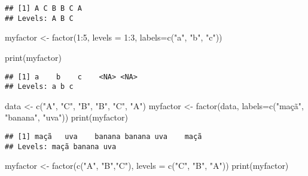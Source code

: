 \documentclass[
]{article}
\newenvironment{Shaded}{\begin{snugshade}}{\end{snugshade}}
\newcommand{\AttributeTok}[1]{\textcolor[rgb]{0.77,0.63,0.00}{#1}}
\newcommand{\DecValTok}[1]{\textcolor[rgb]{0.00,0.00,0.81}{#1}}
\newcommand{\FunctionTok}[1]{\textcolor[rgb]{0.00,0.00,0.00}{#1}}
\newcommand{\NormalTok}[1]{#1}
\newcommand{\OtherTok}[1]{\textcolor[rgb]{0.56,0.35,0.01}{#1}}
\newcommand{\SpecialCharTok}[1]{\textcolor[rgb]{0.00,0.00,0.00}{#1}}
\newcommand{\StringTok}[1]{\textcolor[rgb]{0.31,0.60,0.02}{#1}}
\begin{document}
\begin{verbatim}
## [1] A C B B C A
## Levels: A B C
\end{verbatim}

\begin{Shaded}
\begin{Highlighting}[]
\NormalTok{myfactor }\OtherTok{\textless{}{-}} \FunctionTok{factor}\NormalTok{(}\DecValTok{1}\SpecialCharTok{:}\DecValTok{5}\NormalTok{, }\AttributeTok{levels =} \DecValTok{1}\SpecialCharTok{:}\DecValTok{3}\NormalTok{,}
                   \AttributeTok{labels=}\FunctionTok{c}\NormalTok{(}\StringTok{"a"}\NormalTok{, }\StringTok{"b"}\NormalTok{, }\StringTok{"c"}\NormalTok{))}

\FunctionTok{print}\NormalTok{(myfactor)}
\end{Highlighting}
\end{Shaded}

\begin{verbatim}
## [1] a    b    c    <NA> <NA>
## Levels: a b c
\end{verbatim}

\begin{Shaded}
\begin{Highlighting}[]
\NormalTok{data }\OtherTok{\textless{}{-}} \FunctionTok{c}\NormalTok{(}\StringTok{"A"}\NormalTok{, }\StringTok{"C"}\NormalTok{, }\StringTok{"B"}\NormalTok{, }\StringTok{"B"}\NormalTok{, }\StringTok{"C"}\NormalTok{, }\StringTok{"A"}\NormalTok{)}
\NormalTok{myfactor }\OtherTok{\textless{}{-}} \FunctionTok{factor}\NormalTok{(data, }\AttributeTok{labels=}\FunctionTok{c}\NormalTok{(}\StringTok{"maçã"}\NormalTok{, }\StringTok{"banana"}\NormalTok{, }\StringTok{"uva"}\NormalTok{))}
\FunctionTok{print}\NormalTok{(myfactor)}
\end{Highlighting}
\end{Shaded}

\begin{verbatim}
## [1] maçã   uva    banana banana uva    maçã  
## Levels: maçã banana uva
\end{verbatim}

\begin{Shaded}
\begin{Highlighting}[]
\NormalTok{myfactor }\OtherTok{\textless{}{-}} \FunctionTok{factor}\NormalTok{(}\FunctionTok{c}\NormalTok{(}\StringTok{"A"}\NormalTok{, }\StringTok{"B"}\NormalTok{,}\StringTok{"C"}\NormalTok{),}
                   \AttributeTok{levels =} \FunctionTok{c}\NormalTok{(}\StringTok{"C"}\NormalTok{, }\StringTok{"B"}\NormalTok{, }\StringTok{"A"}\NormalTok{))}
\FunctionTok{print}\NormalTok{(myfactor)}
\end{Highlighting}
\end{Shaded}
\end{document}
